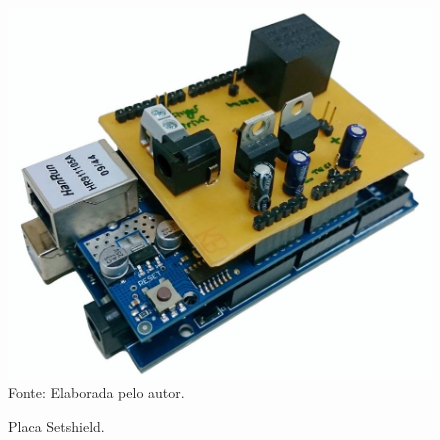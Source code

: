   
\begin{figure}[!t]
  \begin{center}
  \caption{Placa Setshield.}
  \includegraphics[scale=0.3]{figuras/cap4/setshield_v3.jpg}\\
  Fonte: Elaborada pelo autor.
  \label{setshield_v3}
  \end{center}
  \end{figure}
  

